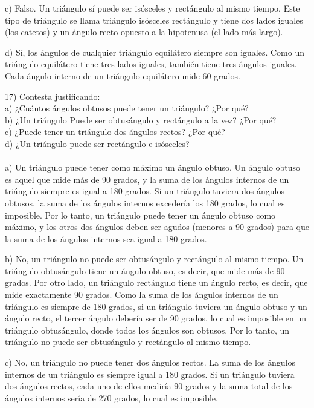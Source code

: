 \documentclass{article}
\begin{document}
c) Falso. Un triángulo sí puede ser isósceles y rectángulo al mismo tiempo. Este tipo de triángulo se llama triángulo isósceles rectángulo y tiene dos lados iguales (los catetos) y un ángulo recto opuesto a la hipotenusa (el lado más largo).

d) Sí, los ángulos de cualquier triángulo equilátero siempre
son iguales. Como un triángulo equilátero tiene tres lados iguales, también tiene tres ángulos iguales. Cada ángulo interno de un triángulo equilátero mide 60 grados.

17) Contesta justificando:\\
a) ¿Cuántos ángulos obtusos puede tener un triángulo? ¿Por qué?\\
b) ¿Un triángulo Puede ser obtusángulo y rectángulo a la vez? ¿Por qué?\\
c) ¿Puede tener un triángulo dos ángulos rectos? ¿Por qué?\\
d) ¿Un triángulo puede ser rectángulo e isósceles?\\
\\
a) Un triángulo puede tener como máximo un ángulo obtuso. Un
ángulo obtuso es aquel que mide más de 90 grados, y la suma de los ángulos internos de un triángulo siempre es igual a 180 grados. Si un triángulo tuviera dos ángulos obtusos, la suma de los ángulos internos excedería los 180 grados, lo cual es imposible. Por lo tanto, un triángulo puede tener un ángulo obtuso como máximo, y los otros dos ángulos deben ser agudos (menores a 90 grados) para que la suma de los ángulos internos sea igual a 180 grados.

b) No, un triángulo no puede ser obtusángulo y rectángulo al mismo tiempo. Un triángulo obtusángulo tiene un ángulo obtuso, es decir, que mide más de 90 grados. Por otro lado, un triángulo rectángulo tiene un ángulo recto, es decir, que mide exactamente 90 grados. Como la suma de los ángulos internos de un triángulo es siempre de 180 grados, si un triángulo tuviera un ángulo obtuso y un ángulo recto, el tercer ángulo debería ser de 90 grados, lo cual es imposible en un triángulo obtusángulo, donde todos los ángulos son obtusos. Por lo tanto, un triángulo no puede ser obtusángulo y rectángulo al mismo tiempo.

c) No, un triángulo no puede tener dos ángulos rectos. La suma de los ángulos internos de un triángulo es siempre igual a 180 grados. Si un triángulo tuviera dos ángulos rectos, cada uno de ellos mediría 90 grados y la suma total de los ángulos internos sería de 270 grados, lo cual es imposible.
\end{document}
